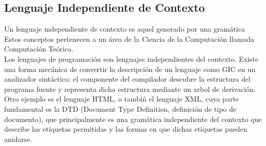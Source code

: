 \documentclass[12pt,a4paper,spanish]{book}
\begin{document}
\subsection{Lenguaje Independiente de Contexto}
Un lenguaje independiente de contexto es aquel generado por una gram\'atica  Estos conceptos pertenecen a un \'area de la Ciencia de la
Computaci\'on llamada Computaci\'on Te\'orica.\\
Los lenguajes de programaci\'on son lenguajes independientes del contexto. Existe una forma mec\'anica de convertir la descripci\'on de un lenguaje como GIC en un analizador sint\'actico: el componente del compilador descubre la estructura del programa fuente y representa dicha estructura mediante un arbol de derivaci\'on.\\
Otro ejemplo es el lenguaje  HTML, o tambi\'n el lenguaje XML, cuya parte fundamental es la DTD (Document Type Definition, definici\'on de tipo de documento), que principalmente es una gram\'atica independiente del contexto que describe las etiquetas permitidas y las formas en que dichas etiquetas pueden anidarse.
\end{document}
